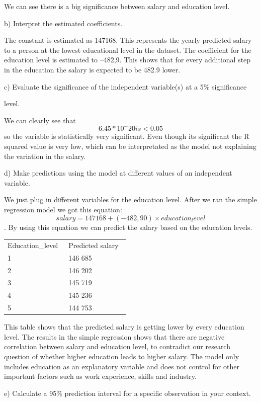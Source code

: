 \documentclass[
  letterpaper,
  DIV=11,
  numbers=noendperiod]{scrartcl}
\newcounter{none} %
\begin{document}
We can see there is a big significance between salary and education
level.

b) Interpret the estimated coefficients.~

The constant is estimated as 147168. This represents the yearly
predicted salary to a person at the lowest educational level in the
dataset. The coefficient for the education level is estimated to
--482,9. This shows that for every additional step in the education the
salary is expected to be 482.9 lower.~

c) Evaluate the significance of the independent variable(s) at a 5\%
significance~

level.~~

We can clearly see that \[6.45*10^-20 is < 0.05\] so the variable is
statistically very significant. Even though its significant the R
squared value is very low, which can be interpretated as the model not
explaining the variation in the salary.~~

d) Make predictions using the model at different values of an
independent variable.~

We just plug in different variables for the education level. After we
ran the simple regression model we got this equation:
\[salary = 147168 + (-482,90) × education_level\]. By using this
equation we can predict the salary based on the education levels.

{\def\LTcaptype{none} %
\begin{longtable}[]{@{}ll@{}}
\toprule\noalign{}
\endhead
\bottomrule\noalign{}
\endlastfoot
Education\_level~ & Predicted salary~ \\
1~ & 146 685~ \\
2~ & 146 202~ \\
3~ & 145 719~ \\
4~ & 145 236~ \\
5~ & 144 753~ \\
\end{longtable}
}

This table shows that the predicted salary is getting lower by every
education level. The results in the simple regression shows that there
are negative correlation between salary and education level, to
contradict our research question of whether higher education leads to
higher salary. The model only includes education as an explanatory
variable and does not control for other important factors such as work
experience, skills and industry.~

e) Calculate a 95\% prediction interval for a specific observation in
your context.~
\end{document}
